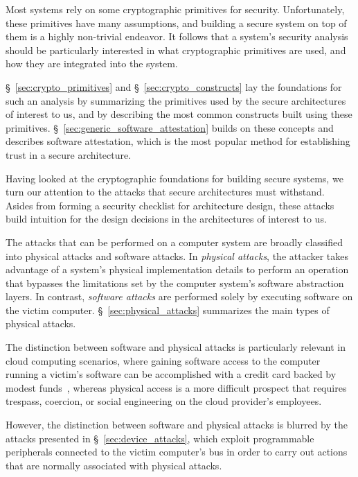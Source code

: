 \label{sec:security_background}

Most systems rely on some cryptographic primitives for security. Unfortunately,
these primitives have many assumptions, and building a secure system on top of
them is a highly non-trivial endeavor. It follows that a system's security
analysis should be particularly interested in what cryptographic primitives are
used, and how they are integrated into the system.

\S~\ref{sec:crypto_primitives} and \S~\ref{sec:crypto_constructs} lay the
foundations for such an analysis by summarizing the primitives used by the
secure architectures of interest to us, and by describing the most
common constructs built using these primitives.
\S~\ref{sec:generic_software_attestation} builds on these concepts and
describes software attestation, which is the most popular method for
establishing trust in a secure architecture.

Having looked at the cryptographic foundations for building secure systems, we
turn our attention to the attacks that secure architectures must withstand.
Asides from forming a security checklist for architecture design, these attacks
build intuition for the design decisions in the architectures of interest to
us.

The attacks that can be performed on a computer system are broadly classified
into physical attacks and software attacks. In \textit{physical attacks}, the
attacker takes advantage of a system's physical implementation details to
perform an operation that bypasses the limitations set by the computer
system's software abstraction layers. In contrast, \textit{software attacks}
are performed solely by executing software on the victim computer.
\S~\ref{sec:physical_attacks} summarizes the main types of physical attacks.

The distinction between software and physical attacks is particularly relevant
in cloud computing scenarios, where gaining software access to the computer
running a victim's software can be accomplished with a credit card backed by
modest funds~\cite{ristenpart2009colocation}, whereas physical access is a
more difficult prospect that requires trespass, coercion, or social engineering
on the cloud provider's employees.

However, the distinction between software and physical attacks is blurred by
the attacks presented in \S~\ref{sec:device_attacks}, which exploit
programmable peripherals connected to the victim computer's bus in order to
carry out actions that are normally associated with physical attacks.

